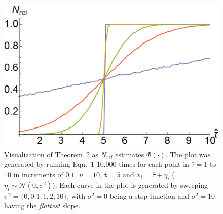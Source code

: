 \documentclass[12pt]{article}
\def\td{\mathbf{t}}   %
\begin{document}
\newpage
\begin{figure}[!ht]
	\centering\includegraphics[width=\columnwidth]{figures/thm2fig.png}
	\centering\caption{Visualization of Theorem~2 as $N_{rel}$ estimates $\Phi(\cdot)$. The plot was generated by running Eqn.~1 10,000 times for each point in $\hat{\tau} = 1$ to $10$ in increments of $0.1$. $n = 10$, $\td = 5$ and $x_i = \hat{\tau} + \eta_i$ ($\eta_i \sim\mathcal{N}(0, \sigma^2)$). Each curve in the plot is generated by sweeping $\sigma^2 = \{0, 0.1, 1, 2, 10\}$, with $\sigma^2 = 0$ being a step-function and $\sigma^2 = 10$ having the \emph{flattest} slope.}\label{fig:thm2fig}
\end{figure}
\end{document}
